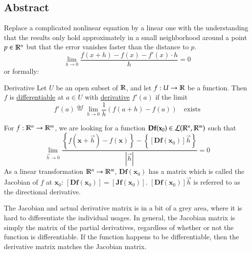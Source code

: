 \subsection{Abstract}
Replace a complicated nonlinear equation by a linear one with the understanding that the results only hold approximately in a small neighborhood around a point $p\in \mathbb{R}^n$ but that the error vanishes faster than the distance to $p$.
\begin{equation}
	\lim_{h\rightarrow 0} \frac{f(x+h)-f(x)-f'(x)\cdot h}{h}=0
\end{equation}
or formally: 
\begin{defn}{Derivative}
	Let $U$ be an open subset of $\mathbb{R}$, and let $f : U\to \mathbb{R}$ be a function. Then $f$ is \ul{differentiable} at $a\in U$ with \ul{derivative} $f'(a)$ if the limit
\begin{equation}
	f'(a)\overset{\mathrm{def}}{=}\lim_{h\rightarrow 0}\frac{1}{h}\left(f(a+h)-f(a)\right)\quad \text{exists}
\end{equation}
\end{defn}
For $f : \mathbb{R}^n \rightarrow \mathbb{R}^m$, we are looking for a function $\textbf{Df}(\textbf{x}_0)\in \mathcal{L}(\mathbb{R}^n,\mathbb{R}^m)$ such that
\begin{equation}
	\lim_{\vec{h}\rightarrow 0} \frac{\left\{f(\bm{x}+\vec{h})-f(\bm{x})\right\}-\left\{[\bm{Df}(\bm{x}_0)]\vec{h}\right\}}{|\vec{h}|}=0
\end{equation}
As a linear transformation $\mathbb{R}^n\rightarrow \mathbb{R}^m$, $\bm{Df}(\bm{x}_0)$ has a matrix which is called the Jacobian of $f$ at $\bm{x}_0$: $[\bm{Df}(\bm{x}_0)]=[\bm{Jf}(\bm{x}_{0})]$. $[\bm{Df}(\bm{x}_0)]\vec{h}$ is referred to as the directional derivative. 

The Jacobian and actual derivative matrix is in a bit of a grey area, where it is hard to differentiate the individual usages. In general, the Jacobian matrix is simply the matrix of the partial derivatives, regardless of whether or not the function is differentiable. If the function happens to be differentiable, then the derivative matrix matches the Jacobian matrix. 
